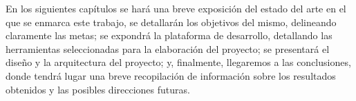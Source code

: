 En los siguientes capítulos %
se hará una breve exposición del estado del arte en el que se enmarca este trabajo, se detallarán los objetivos del mismo, delineando claramente las metas; se expondrá la plataforma de desarrollo, detallando las herramientas seleccionadas para la elaboración del proyecto; se presentará el diseño y la arquitectura del proyecto; y, finalmente, llegaremos a las conclusiones, donde tendrá lugar una breve recopilación de información sobre los resultados obtenidos y las posibles direcciones futuras. 
